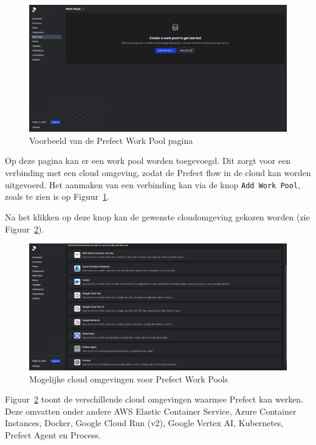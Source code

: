 \begin{figure}[h]
    \centering
    \includegraphics[width=0.9\linewidth]{graphics/Prefect_Work_Pools.PNG}
    \caption{Voorbeeld van de Prefect Work Pool pagina}
    \label{fig:Prefect_Work_Pools}
\end{figure}

Op deze pagina kan er een work pool worden toegevoegd. Dit zorgt voor een verbinding met een cloud omgeving, zodat de Prefect flow in de cloud kan worden uitgevoerd. Het aanmaken van een verbinding kan via de knop \texttt{Add Work Pool}, zoals te zien is op Figuur~\ref{fig:Prefect_Work_Pools}.

Na het klikken op deze knop kan de gewenste cloudomgeving gekozen worden (zie Figuur~\ref{fig:Prefect_Work_Pools_Create}).

\begin{figure}[h]
    \centering
    \includegraphics[width=0.9\linewidth]{graphics/Prefect_Work_Pools_Create.PNG}
    \caption{Mogelijke cloud omgevingen voor Prefect Work Pools}
    \label{fig:Prefect_Work_Pools_Create}
\end{figure}

Figuur~\ref{fig:Prefect_Work_Pools_Create} toont de verschillende cloud omgevingen waarmee Prefect kan werken. Deze omvatten onder andere AWS Elastic Container Service, Azure Container Instances, Docker, Google Cloud Run (v2), Google Vertex AI, Kubernetes, Prefect Agent en Process.

